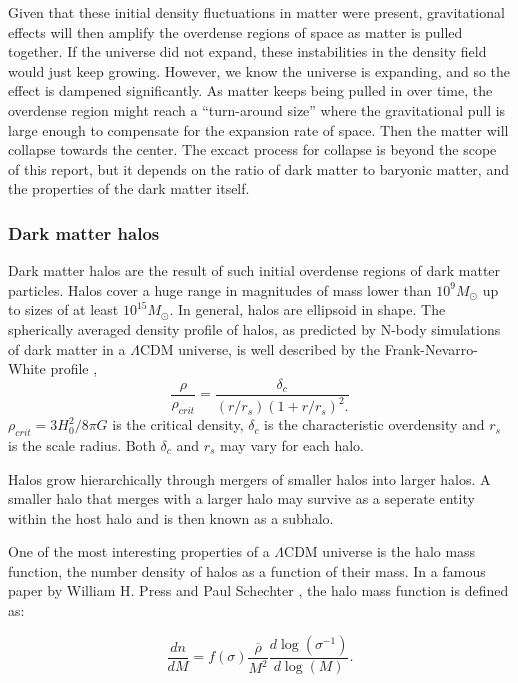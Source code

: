 Given that these initial density fluctuations in matter were present, gravitational effects will then amplify the overdense regions of space as matter is pulled together. If the universe did not expand, these instabilities in the density field would just keep growing. However, we know the universe is expanding, and so the effect is dampened significantly. As matter keeps being pulled in over time, the overdense region might reach a ``turn-around size'' where the gravitational pull is large enough to compensate for the expansion rate of space. Then the matter will collapse towards the center. The excact process for collapse is beyond the scope of this report, but it depends on the ratio of dark matter to baryonic matter, and the properties of the dark matter itself. 

\subsubsection{Dark matter halos}
Dark matter halos are the result of such initial overdense regions of dark matter particles. Halos cover a huge range in magnitudes of mass lower than $10^9 M_{\odot}$ up to sizes of at least $10^{15} M_{\odot}$. In general, halos are ellipsoid in shape. The spherically averaged density profile of halos, as predicted by N-body simulations of dark matter in a $\Lambda$CDM universe, is well described by the Frank-Nevarro-White profile \parencite{Navarro1996},
\begin{equation}
    \frac{\rho}{\rho_{crit}} = \frac{\delta_c}{(r/r_s)(1+r/r_s)^2.}
\end{equation}
$\rho_{crit} = 3H_0^2/8\pi G$ is the critical density, $\delta_c$ is the characteristic overdensity and $r_s$ is the scale radius. Both $\delta_c$ and $r_s$ may vary for each halo.

Halos grow hierarchically through mergers of smaller halos into larger halos. A smaller halo that merges with a larger halo may survive as a seperate entity within the host halo and is then known as a subhalo. 

One of the most interesting properties of a $\Lambda$CDM universe is the halo mass function, the number density of halos as a function of their mass. In a famous paper by William H. Press and Paul Schechter \parencite{Press1974}, the halo mass function is defined as:

\begin{equation}
    \frac{dn}{dM} = f(\sigma)\frac{\overline{\rho}}{M^2}\frac{d\log(\sigma^{-1})}{d\log(M)}.
\end{equation}

